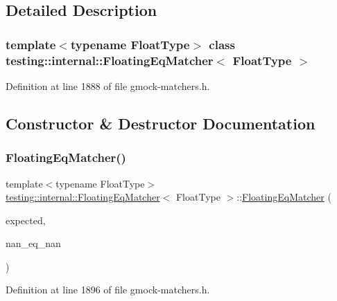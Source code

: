 \subsection{Detailed Description}
\subsubsection*{template$<$typename Float\+Type$>$\newline
class testing\+::internal\+::\+Floating\+Eq\+Matcher$<$ Float\+Type $>$}



Definition at line 1888 of file gmock-\/matchers.\+h.



\subsection{Constructor \& Destructor Documentation}
\mbox{\label{classtesting_1_1internal_1_1FloatingEqMatcher_a92b08d1635c900fa8571ff4eff30b4bb}} 
\subsubsection{\texorpdfstring{Floating\+Eq\+Matcher()}{FloatingEqMatcher()}\hspace{0.1cm}{\footnotesize\ttfamily [1/2]}}
{\footnotesize\ttfamily template$<$typename Float\+Type$>$ \\
\hyperlink{classtesting_1_1internal_1_1FloatingEqMatcher}{testing\+::internal\+::\+Floating\+Eq\+Matcher}$<$ Float\+Type $>$\+::\hyperlink{classtesting_1_1internal_1_1FloatingEqMatcher}{Floating\+Eq\+Matcher} (\begin{DoxyParamCaption}\item[{Float\+Type}]{expected,  }\item[{\hyperlink{classbool}{bool}}]{nan\+\_\+eq\+\_\+nan }\end{DoxyParamCaption})\hspace{0.3cm}{\ttfamily [inline]}}



Definition at line 1896 of file gmock-\/matchers.\+h.


